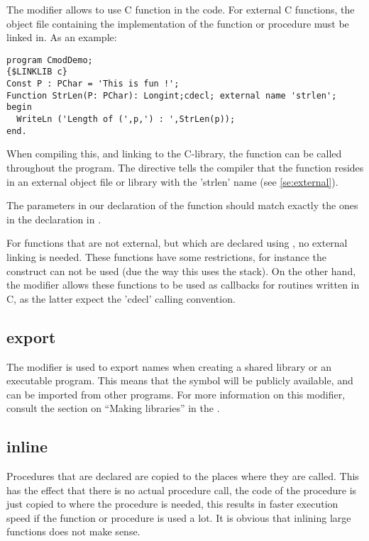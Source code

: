 The  modifier allows to use C function in the code. 
For external C functions, the object file containing the  
implementation of the function or procedure must be linked in.
As an example:
\begin{verbatim}
program CmodDemo;
{$LINKLIB c}
Const P : PChar = 'This is fun !';
Function StrLen(P: PChar): Longint;cdecl; external name 'strlen';
begin
  WriteLn ('Length of (',p,') : ',StrLen(p));
end.
\end{verbatim}
When compiling this, and linking to the C-library, the  function
can be called throughout the program. The  directive tells
the compiler that the function resides in an external object file or library
with the 'strlen' name (see \ref{se:external}).
\begin{remark}
The parameters in our declaration of the  function should
match exactly the ones in the declaration in .
\end{remark}

For functions that are not external, but which are declared using
, no external linking is needed. These functions have some
restrictions, for instance the  construct can not be
used (due the way this uses the stack). On the other hand, the
 modifier allows these functions to be used as callbacks for 
routines written in C, as the latter expect the 'cdecl' calling convention.

\subsection{export}
The  modifier is used to export names when creating a shared library
or an executable program. This means that the symbol will be publicly
available, and can be imported from other programs. For more information
on this modifier, consult the section on ``Making libraries''
in the \progref.

\subsection{inline}
\label{se:inline}
Procedures that are declared  are copied to the places where they
are called. This has the effect that there is no actual procedure call,
the code of the procedure is just copied to where the procedure is needed,
this results in faster execution speed if the function or procedure is
used a lot. It is obvious that inlining large functions does not make sense.

